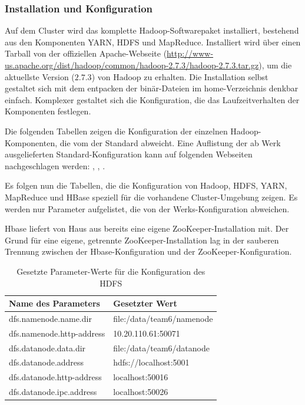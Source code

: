 \subsubsection{Installation und Konfiguration}
Auf dem Cluster wird das komplette Hadoop-Softwarepaket installiert, bestehend aus den
Komponenten \ac{YARN}, \ac{HDFS} und MapReduce. Installiert wird über einen Tarball von der offiziellen
Apache-Webseite (\url{http://www-us.apache.org/dist/hadoop/common/hadoop-2.7.3/hadoop-2.7.3.tar.gz}), um die aktuellste Version ($2.7.3$) von Hadoop zu erhalten. Die Installation selbst gestaltet sich mit dem entpacken der binär-Dateien im home-Verzeichnis 
denkbar einfach. Komplexer gestaltet sich die Konfiguration, die das Laufzeitverhalten der Komponenten festlegen.

Die folgenden Tabellen zeigen die Konfiguration der einzelnen Hadoop-Komponenten, die vom der Standard abweicht.
Eine Auflistung der ab Werk ausgelieferten Standard-Konfiguration kann auf folgenden Webseiten nachgeschlagen werden:
\cite{hdfsDefault}, \cite{yarnDefault}, \cite{mapreduceDefault} \cite{hbaseConfig}.

Es folgen nun die Tabellen, die die Konfiguration von Hadoop, HDFS, YARN, MapReduce und HBase 
speziell für die vorhandene Cluster-Umgebung zeigen. Es werden  nur Parameter aufgelistet, 
die von der Werks-Konfiguration abweichen.

Hbase liefert von Haus aus bereits eine eigene ZooKeeper-Installation mit. Der Grund für eine eigene, getrennte ZooKeeper-Installation lag in der sauberen Trennung zwischen der Hbase-Konfiguration und der ZooKeeper-Konfiguration. 

\begin{table}
	\begin{tabularx}{\textwidth}{| X | X |} \hline
		Name des Parameters & Gesetzter Wert \\ \hline
		dfs.namenode.name.dir & file:/data/team6/namenode \\ \hline
		dfs.namenode.http-address & 10.20.110.61:50071  \\ \hline
		dfs.datanode.data.dir & file:/data/team6/datanode \\ \hline
		dfs.datanode.address & hdfs://localhost:5001 \\ \hline
		dfs.datanode.http-address & localhost:50016 \\ \hline
		dfs.datanode.ipc.address & localhost:50026 \\ \hline
	\end{tabularx}
	\caption{Gesetzte Parameter-Werte für die Konfiguration des HDFS}
	\label{config:hdfsValues}
\end{table}

